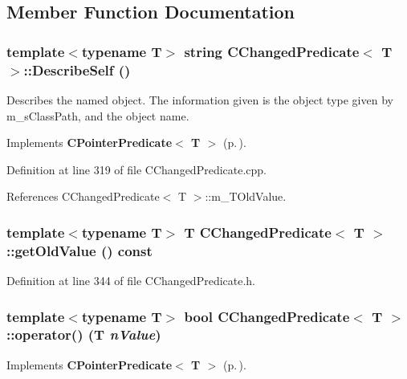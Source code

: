 \subsection{Member Function Documentation}
\subsubsection{\setlength{\rightskip}{0pt plus 5cm}template$<$typename T$>$ string CChanged\-Predicate$<$ T $>$::Describe\-Self ()\hspace{0.3cm}{\tt  [virtual]}}\label{classCChangedPredicate_a7}


Describes the named object. The information given is the object type given by m\_\-s\-Class\-Path, and the object name. 

Implements {\bf CPointer\-Predicate$<$ T $>$} {\rm (p.\,\pageref{classCPointerPredicate_a6})}.

Definition at line 319 of file CChanged\-Predicate.cpp.

References CChanged\-Predicate$<$ T $>$::m\_\-TOld\-Value.
\subsubsection{\setlength{\rightskip}{0pt plus 5cm}template$<$typename T$>$ T CChanged\-Predicate$<$ T $>$::get\-Old\-Value () const\hspace{0.3cm}{\tt  [inline]}}\label{classCChangedPredicate_a5}




Definition at line 344 of file CChanged\-Predicate.h.
\subsubsection{\setlength{\rightskip}{0pt plus 5cm}template$<$typename T$>$ bool CChanged\-Predicate$<$ T $>$::operator() (T {\em n\-Value})\hspace{0.3cm}{\tt  [virtual]}}\label{classCChangedPredicate_a6}




Implements {\bf CPointer\-Predicate$<$ T $>$} {\rm (p.\,\pageref{classCPointerPredicate_a5})}.

